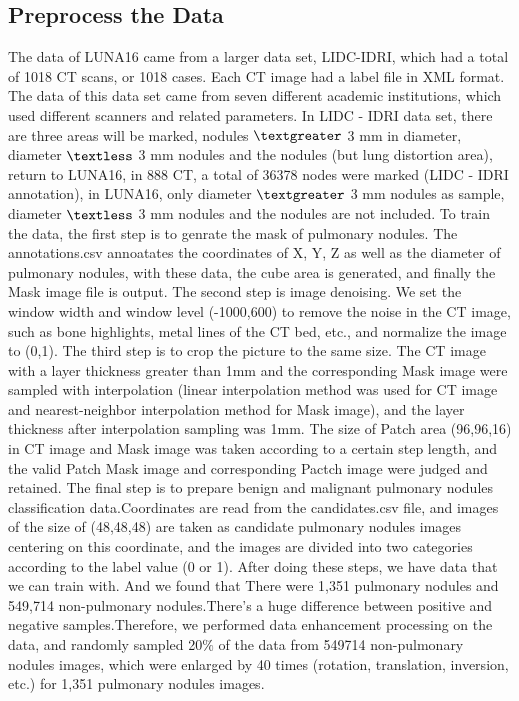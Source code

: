 \documentclass[conference]{IEEEtran}
\begin{document}
\begin{CJK}{UTF8}{gbsn}
\subsection{Preprocess the Data}
The data of LUNA16 came from a larger data set, LIDC-IDRI, which had a total of 1018 CT scans, or 1018 cases. Each CT image had a label file in XML format. The data of this data set came from seven different 
academic institutions, which used different scanners and related parameters. In LIDC - IDRI data set, there are three areas will be marked, nodules $\textgreater$ 3 mm in diameter, diameter $\textless $ 3 mm nodules and the nodules
 (but lung distortion area), return to LUNA16, in 888 CT, a total of 36378 nodes were marked (LIDC - IDRI annotation), in LUNA16, only diameter $\textgreater$ 3 mm nodules as sample, diameter $\textless $ 3 mm nodules and the nodules are not included. 
 To train the data, the first step is to genrate the mask of pulmonary nodules. The annotations.csv annoatates the coordinates of X, Y, Z as well as the diameter of pulmonary nodules, with these data, the cube area is generated, and finally the Mask image file is output.
The second step is image denoising. We set the window width and window level (-1000,600) to remove the noise in the CT image, such as bone highlights, metal lines of the CT bed, etc., and normalize the image to (0,1). The third step is to crop the picture to the same size.
The CT image with a layer thickness greater than 1mm and the corresponding Mask image were sampled with interpolation (linear interpolation method was used for CT image and nearest-neighbor interpolation method for Mask image), and the layer thickness after interpolation sampling was 1mm.
The size of Patch area (96,96,16) in CT image and Mask image was taken according to a certain step length, and the valid Patch Mask image and corresponding Pactch image were judged and retained. The final step is to prepare benign and malignant pulmonary nodules classification data.Coordinates are read from the candidates.csv file, and images of the size 
of (48,48,48) are taken as candidate pulmonary nodules images centering on this coordinate, and the images are divided into two categories according to the label value (0 or 1).
After doing these steps, we have data that we can train with. And we found that There were 1,351 pulmonary nodules and 549,714 non-pulmonary nodules.There's a huge difference between positive and negative samples.Therefore, we performed data enhancement processing on the data, and randomly sampled 20$\%$ of the data from 549714 non-pulmonary nodules images, which were enlarged by 40 times (rotation, translation, inversion, etc.) for 1,351 pulmonary nodules images.

\end{CJK}
\end{document}
